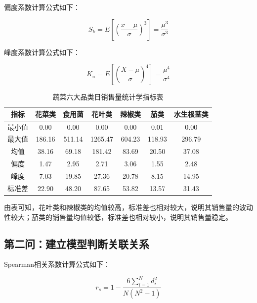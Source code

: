 \documentclass[a4paper,12pt]{article}
\begin{document}
	偏度系数计算公式如下：
	
	\begin{equation}
		S_k = E\left[\left(\frac{x-\mu}{\sigma}\right)^3\right] = \frac{\mu^3}{\sigma^3}
		\label{eq:skewness}
	\end{equation}
	
	峰度系数计算公式如下：
	
	\begin{equation}
		K_u = E\left[\left(\frac{X-\mu}{\sigma}\right)^4\right] = \frac{\mu^4}{\sigma^4}
		\label{eq:kurtosis}
	\end{equation}
	
	\begin{table}[H]
		\centering
		\caption{蔬菜六大品类日销售量统计学指标表}
		\begin{tabular}{c|c|c|c|c|c|c}
			\hline
			\textbf{指标} & \textbf{花菜类} & \textbf{食用菌} & \textbf{花叶类} & \textbf{辣椒类} & \textbf{茄类} & \textbf{水生根茎类} \\
			\hline
			最小值 & 0.00 & 0.00 & 0.00 & 0.00 & 0.01 & 0.00 \\
			最大值 & 186.16 & 511.14 & 1265.47 & 604.23 & 118.93 & 296.79 \\
			均值 & 38.16 & 69.18 & 181.42 & 83.69 & 20.50 & 37.08 \\
			偏度 & 1.47 & 2.95 & 2.71 & 3.06 & 1.55 & 2.48 \\
			峰度 & 7.03 & 19.85 & 27.36 & 20.78 & 8.15 & 14.95 \\
			标准差 & 22.90 & 48.20 & 87.65 & 53.82 & 13.57 & 31.43 \\
			\hline
		\end{tabular}
	\end{table}
	
	由表可知，花叶类和辣椒类的均值较高，标准差也相对较大，说明其销售量的波动性较大；茄类的销售量均值较低，标准差也相对较小，说明其销售量稳定。
	
	\subsection{第二问：建立模型判断关联关系}
	
	Spearman相关系数计算公式如下：
	
	\begin{equation}
		r_s = 1 - \frac{6\sum_{i=1}^{N}d_i^2}{N(N^2-1)}
		\label{eq:spearman}
	\end{equation}
	
\end{document}
